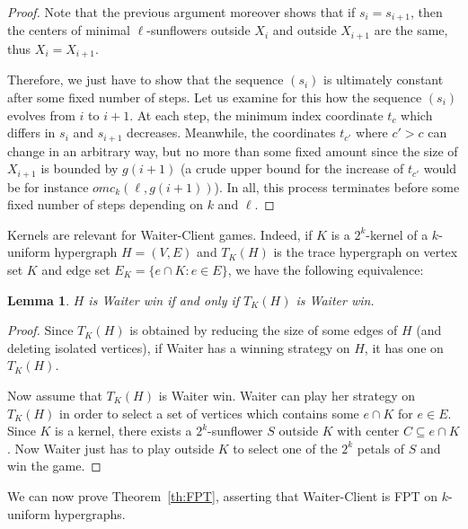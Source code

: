 \documentclass{article}
\newcommand{\hedge}{edge\xspace}
\newcommand{\hedges}{edges\xspace}
\newtheorem{lemma}[theorem]{Lemma}
\begin{document}
\begin{proof}
 Note that the previous argument moreover shows that if $s_i=s_{i+1}$, then the centers of minimal $\ell$-sunflowers outside $X_i$ and outside $X_{i+1}$ are the same, thus $X_i=X_{i+1}$. 
 
 Therefore, we just have to show that the sequence $(s_i)$ is ultimately constant after some fixed number of steps. 
 Let us examine for this how the sequence $(s_i)$ evolves from $i$ to $i+1$. At each step, the minimum index coordinate $t_c$ which differs in $s_i$ and $s_{i+1}$ decreases. Meanwhile, the coordinates $t_{c'}$ where $c'>c$ can change in an arbitrary way, but no more than some fixed amount since the size of $X_{i+1}$ is bounded by $g(i+1)$ (a crude upper bound for the increase of $t_{c'}$ would be for instance $omc_k(\ell,g(i+1))$). In all, this process terminates before some fixed number of steps depending on $k$ and \(\ell\). \end{proof}

Kernels are relevant for Waiter-Client games. Indeed, if $K$ is a $2^k$-kernel of a $k$-uniform hypergraph $H=(V,E)$ and $T_K(H)$ is the trace hypergraph on vertex set $K$ and \hedge set $E_K=\{e\cap K:e\in E\}$, we have the following equivalence:

\begin{lemma}\label{lem:equiv}
$H$ is Waiter win if and only if $T_K(H)$ is Waiter win. 
\end{lemma}

\begin{proof}
Since $T_K(H)$ is obtained by reducing the size of some \hedges of $H$ (and deleting isolated vertices), if Waiter has a winning strategy on $H$, it has one on $T_K(H)$.

Now assume that $T_K(H)$ is Waiter win. Waiter can play her strategy on $T_K(H)$ in order to select a set of vertices which contains some $e\cap K$ for $e\in E$. Since $K$ is a kernel, there exists a $2^k$-sunflower $S$ outside $K$ with center $C\subseteq e\cap K$. Now Waiter just has to play outside $K$ to select one of the $2^k$ petals of $S$ and win the game.
\end{proof}

We can now prove Theorem~\ref{th:FPT}, asserting that Waiter-Client is FPT on $k$-uniform hypergraphs. 
\end{document}
